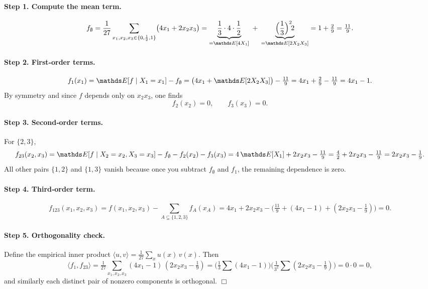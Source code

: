 \documentclass[a4paper]{article}
\begin{document}
\paragraph{Step 1. Compute the mean term.}
\[
f_\emptyset
=\frac{1}{27}\sum_{x_1,x_2,x_3\in\{0,\frac12,1\}}
   \bigl(4x_1 + 2x_2x_3\bigr)
= \underbrace{\frac{1}{3}\cdot4\cdot\frac{1}{2}}_{=\E[4X_1]} \;+\;
  \underbrace{\Bigl(\frac{1}{3}\Bigr)^{2}\!2}_{=\E[2X_2X_3]}
=1 + \tfrac{2}{9} = \tfrac{11}{9}.
\]

\paragraph{Step 2. First‐order terms.}
\[
f_1(x_1)
=\E[f\mid X_1=x_1] - f_\emptyset
= \bigl(4x_1 + \E[2X_2X_3]\bigr) - \tfrac{11}{9}
=4x_1 + \tfrac{2}{9} - \tfrac{11}{9}
=4x_1 - 1.
\]
By symmetry and since $f$ depends only on $x_2x_3$, one finds
\[
f_2(x_2)=0,\qquad f_3(x_3)=0.
\]

\paragraph{Step 3. Second‐order terms.}
For $\{2,3\}$,
\[
f_{23}(x_2,x_3)
=\E[f\mid X_2=x_2,X_3=x_3]
- f_\emptyset - f_2(x_2)-f_3(x_3)
= 4\,\E[X_1] +2x_2x_3 - \tfrac{11}{9}
= \tfrac{4}{2} +2x_2x_3 - \tfrac{11}{9}
=2x_2x_3 - \tfrac{1}{9}.
\]
All other pairs $\{1,2\}$ and $\{1,3\}$ vanish because once you subtract
$f_\emptyset$ and $f_1$, the remaining dependence is zero.

\paragraph{Step 4. Third‐order term.}
\[
f_{123}(x_1,x_2,x_3)
= f(x_1,x_2,x_3)
- \sum_{A\subsetneq\{1,2,3\}} f_A(x_A)
= 4x_1+2x_2x_3
- \bigl(\tfrac{11}{9} + (4x_1-1) + (2x_2x_3-\tfrac{1}{9})\bigr)
=0.
\]

\paragraph{Step 5. Orthogonality check.}
Define the empirical inner product 
\(\langle u,v\rangle = \tfrac1{27}\sum_{x}u(x)\,v(x)\).  Then
\[
\langle f_1, f_{23}\rangle
=\tfrac1{27}\sum_{x_1,x_2,x_3}(4x_1-1)\,(2x_2x_3-\tfrac{1}{9})
= \bigl(\tfrac1{3}\sum(4x_1-1)\bigr)
  \bigl(\tfrac1{3^2}\sum(2x_2x_3-\tfrac19)\bigr)
=0\cdot0=0,
\]
and similarly each distinct pair of nonzero components is orthogonal.
\hfill\(\Box\)

\end{document}
